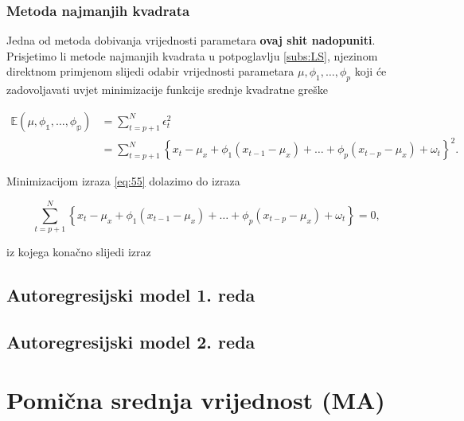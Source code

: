 \documentclass[a4paper,12pt,oneside]{memoir}
\begin{document}
            \subsubsection{Metoda najmanjih kvadrata}

            Jedna od metoda dobivanja vrijednosti parametara \textbf{ovaj shit nadopuniti}. Prisjetimo li metode najmanjih kvadrata u potpoglavlju \ref{subs:LS}, njezinom direktnom primjenom slijedi odabir vrijednosti parametara $\mu,\phi_1,\ldots,\phi_p$ koji će zadovoljavati uvjet minimizacije funkcije srednje kvadratne greške
            
            \begin{equation}
                \begin{split}
                    \mathbb{E(\mu,\phi_1,\ldots,\phi_p)}&=\displaystyle\sum_{t=p+1}^N\epsilon_t^2\\
                    & =\displaystyle\sum_{t=p+1}^N\left\{x_t-\mu_x+\phi_1\left(x_{t-1}-\mu_x\right)+\ldots+\phi_p\left(x_{t-p}-\mu_x\right)+\omega_t\right\}^2.
                \end{split}
                \label{eq:56}
            \end{equation}

            Minimizacijom izraza \ref{eq:55} dolazimo do izraza
            
            \begin{equation}
                \displaystyle\sum_{t=p+1}^N\left\{x_t-\mu_x+\phi_1\left(x_{t-1}-\mu_x\right)+\ldots+\phi_p\left(x_{t-p}-\mu_x\right)+\omega_t\right\}=0,
            \end{equation}
            \label{subs:511}

            iz kojega konačno slijedi izraz


            \subsection{Autoregresijski model 1. reda}
            \label{subs:512}
            \subsection{Autoregresijski model 2. reda}
            \label{subs:513}




        \section{Pomična srednja vrijednost (MA)}
\end{document}
